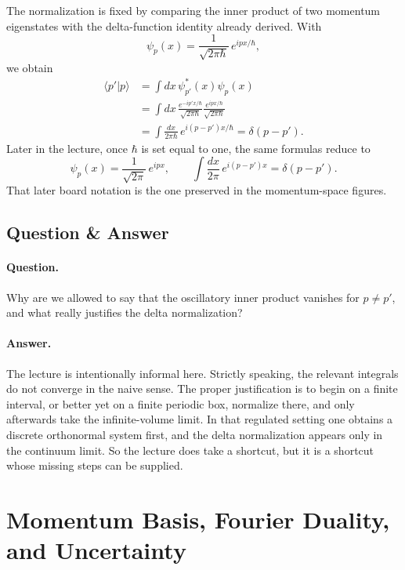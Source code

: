 The normalization is fixed by comparing the inner product of two momentum eigenstates with the delta-function identity already derived. With
\begin{equation}
\psi_p(x)=\frac{1}{\sqrt{2\pi\hbar}}\,e^{ipx/\hbar},
\end{equation}
we obtain
\begin{align}
\langle p'|p\rangle
&=\int dx\,\psi_{p'}^*(x)\psi_p(x) \\
&=\int dx\,\frac{e^{-ip'x/\hbar}}{\sqrt{2\pi\hbar}}
\frac{e^{ipx/\hbar}}{\sqrt{2\pi\hbar}} \\
&=\int \frac{dx}{2\pi\hbar}\,e^{i(p-p')x/\hbar}
=\delta(p-p').
\end{align}
Later in the lecture, once $\hbar$ is set equal to one, the same formulas reduce to
\begin{equation}
\psi_p(x)=\frac{1}{\sqrt{2\pi}}\,e^{ipx},
\qquad
\int \frac{dx}{2\pi}\,e^{i(p-p')x}=\delta(p-p').
\end{equation}
That later board notation is the one preserved in the momentum-space figures.

\subsection{Question \& Answer}

\paragraph{Question.} Why are we allowed to say that the oscillatory inner product vanishes for $p\neq p'$, and what really justifies the delta normalization?

\paragraph{Answer.} The lecture is intentionally informal here. Strictly speaking, the relevant integrals do not converge in the naive sense. The proper justification is to begin on a finite interval, or better yet on a finite periodic box, normalize there, and only afterwards take the infinite-volume limit. In that regulated setting one obtains a discrete orthonormal system first, and the delta normalization appears only in the continuum limit. So the lecture does take a shortcut, but it is a shortcut whose missing steps can be supplied.

\section{Momentum Basis, Fourier Duality, and Uncertainty}

